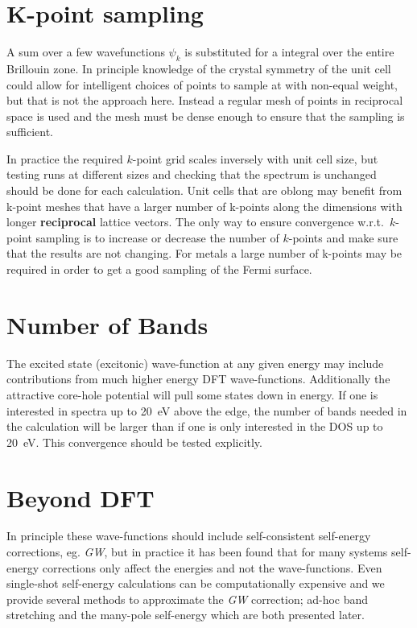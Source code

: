\documentclass[11pt]{report}
\begin{document}
\section{K-point sampling}

A sum over a few wavefunctions $\psi_k$ is substituted for a integral over the entire Brillouin zone. In principle knowledge of the crystal symmetry of the unit cell could allow for intelligent choices of  points to sample at with non-equal weight, but that is not the approach here. Instead a regular mesh of points in reciprocal space is used and the mesh must be dense enough to ensure that the sampling is sufficient. 

In practice the required $k$-point grid scales inversely with unit cell size, but testing runs at different sizes and checking that the spectrum is unchanged should be done for each calculation. Unit cells that are oblong may benefit from k-point meshes that have a larger number of k-points along the dimensions with longer {\bf reciprocal} lattice vectors. The only way to ensure convergence w.r.t.\ $k$-point sampling is to increase or decrease the number of $k$-points and make sure that the results are not changing. For metals a large number of k-points may be required in order to get a good sampling of the Fermi surface.

\section{Number of Bands}

The excited state (excitonic) wave-function at any given energy may include contributions from much higher energy DFT wave-functions. Additionally the attractive core-hole potential will pull some states down in energy. If one is interested in spectra up to 20~eV above the edge, the number of bands needed in the calculation will be larger than if one is only interested in the DOS up to 20~eV. This convergence should be tested explicitly. 

\section{Beyond DFT}

In principle these wave-functions should include self-consistent self-energy corrections, eg. {\it GW}, 
but in practice it has been found that for many systems 
self-energy corrections only affect the energies and not the wave-functions. 
Even single-shot self-energy calculations can be computationally expensive 
and we provide several methods to approximate the {\it GW} correction; 
ad-hoc band stretching and the many-pole self-energy which are both presented later.
\end{document}
